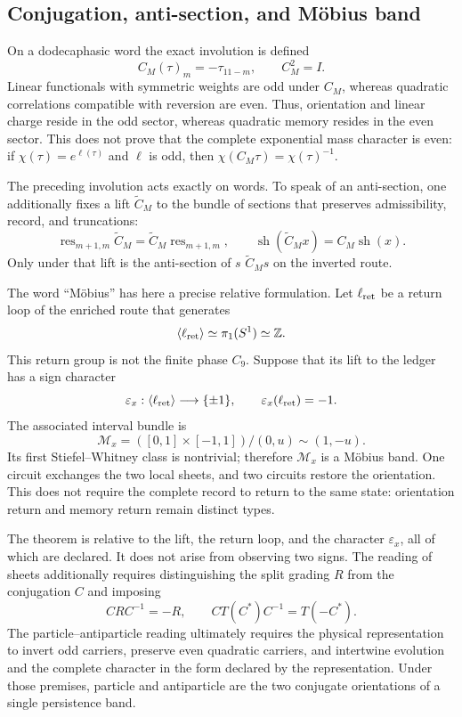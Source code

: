 \subsection{Conjugation, anti-section, and Möbius band}

On a dodecaphasic word the exact involution is defined
\[
 C_M(\tau)_m=-\tau_{11-m},
 \qquad C_M^2=I.
\]
Linear functionals with symmetric weights are odd under \(C_M\),
whereas quadratic correlations compatible with reversion are
even. Thus, orientation and linear charge reside in the odd sector,
whereas quadratic memory resides in the even sector. This does not prove that
the complete exponential mass character is even: if
\(\chi(\tau)=e^{\ell(\tau)}\) and \(\ell\) is odd, then
\(\chi(C_M\tau)=\chi(\tau)^{-1}\).

The preceding involution acts exactly on words. To speak of an
anti-section, one additionally fixes a lift \(\widetilde C_M\) to the bundle of
sections that preserves admissibility, record, and truncations:
\[
 \operatorname{res}_{m+1,m}\widetilde C_M
 =\widetilde C_M\operatorname{res}_{m+1,m},
 \qquad
 \operatorname{sh}(\widetilde C_Mx)=C_M\operatorname{sh}(x).
\]
Only under that lift is the anti-section of \(s\)
\(\widetilde C_Ms\) on the inverted route.

The word ``Möbius'' has here a precise relative formulation. Let
\(\ell_{\rm ret}\) be a return loop of the enriched route that generates
\[
 \langle\ell_{\rm ret}\rangle\simeq\pi_1(S^1)\simeq\mathbb Z.
\]
This return group is not the finite phase \(C_9\). Suppose that its
lift to the
ledger has a sign character
\[
 \varepsilon_x:\langle\ell_{\rm ret}\rangle\longrightarrow\{\pm1\},
 \qquad \varepsilon_x(\ell_{\rm ret})=-1.
\]
The associated interval bundle is
\[
 \mathcal M_x=
 ([0,1]\times[-1,1])/(0,u)\sim(1,-u).
\]
Its first Stiefel--Whitney class is nontrivial; therefore
\(\mathcal M_x\) is a Möbius band. One circuit exchanges the two
local sheets, and two circuits restore the orientation. This does not require the
complete record to return to the same state: orientation return and memory
return remain distinct types.

The theorem is relative to the lift, the return loop, and the character
\(\varepsilon_x\), all of which are declared. It does not arise from observing two signs.
The reading of sheets additionally requires distinguishing the split grading \(R\)
from the conjugation \(C\) and imposing
\[
 CRC^{-1}=-R,
 \qquad CT(C^*)C^{-1}=T(-C^*).
\]
The particle--antiparticle reading ultimately requires the physical
representation to invert odd carriers, preserve even quadratic
carriers, and intertwine evolution and the complete character in the form declared
by the representation. Under those premises, particle and antiparticle are
the two conjugate orientations of a single persistence band.

